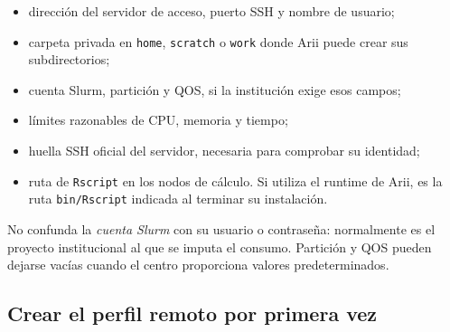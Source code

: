 \documentclass[11pt,a4paper,openany]{report}
\newcommand{\code}[1]{\texttt{#1}}
\begin{document}
\begin{itemize}
  \item dirección del servidor de acceso, puerto SSH y nombre de usuario;
  \item carpeta privada en \code{home}, \code{scratch} o \code{work} donde Arii
  puede crear sus subdirectorios;
  \item cuenta Slurm, partición y QOS, si la institución exige esos campos;
  \item límites razonables de CPU, memoria y tiempo;
  \item huella SSH oficial del servidor, necesaria para comprobar su identidad;
  \item ruta de \code{Rscript} en los nodos de cálculo. Si utiliza el runtime de
  Arii, es la ruta \code{bin/Rscript} indicada al terminar su instalación.
\end{itemize}

No confunda la \emph{cuenta Slurm} con su usuario o contraseña: normalmente es el
proyecto institucional al que se imputa el consumo. Partición y QOS pueden
dejarse vacías cuando el centro proporciona valores predeterminados.

\subsection{Crear el perfil remoto por primera vez}
\end{document}
